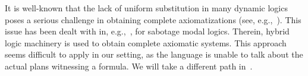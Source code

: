 It is well-known that the lack of uniform substitution in many dynamic logics poses a serious challenge in obtaining complete axiomatizations (see, e.g.,~\cite{HoHoIc11}). This issue has been dealt with in, e.g.,~\cite{BenthemMZ2022,BenthemLSY22}, for sabotage modal logics.
Therein, hybrid logic machinery is used to obtain complete axiomatic systems. This approach seems difficult to apply in our setting, as the language is unable to talk about the actual plans witnessing a formula. We will take a different path in~.

%

%
%
%
%

